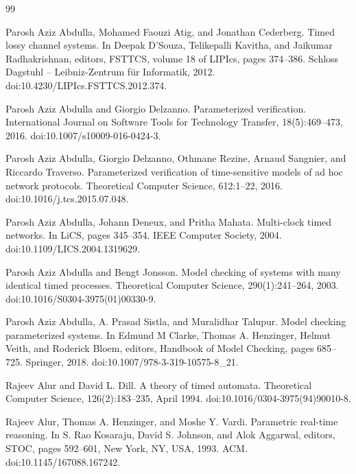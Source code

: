 \begin{thebibliography}{99}
\par\noindent    Parosh Aziz Abdulla, Mohamed Faouzi Atig, and Jonathan Cederberg.  Timed lossy channel systems.  In Deepak D’Souza, Telikepalli Kavitha, and Jaikumar Radhakrishnan, editors, FSTTCS, volume 18 of LIPIcs, pages 374--386. Schloss Dagstuhl -- Leibniz-Zentrum für Informatik, 2012.  doi:10.4230/LIPIcs.FSTTCS.2012.374.  

\par\noindent    Parosh Aziz Abdulla and Giorgio Delzanno.  Parameterized verification.  International Journal on Software Tools for Technology Transfer, 18(5):469--473, 2016.  doi:10.1007/s10009-016-0424-3.  

\par\noindent    Parosh Aziz Abdulla, Giorgio Delzanno, Othmane Rezine, Arnaud Sangnier, and Riccardo Traverso.  Parameterized verification of time-sensitive models of ad hoc network protocols.  Theoretical Computer Science, 612:1--22, 2016.  doi:10.1016/j.tcs.2015.07.048.  

\par\noindent    Parosh Aziz Abdulla, Johann Deneux, and Pritha Mahata.  Multi-clock timed networks.  In LiCS, pages 345--354. IEEE Computer Society, 2004.  doi:10.1109/LICS.2004.1319629.  

\par\noindent    Parosh Aziz Abdulla and Bengt Jonsson.  Model checking of systems with many identical timed processes.  Theoretical Computer Science, 290(1):241--264, 2003.  doi:10.1016/S0304-3975(01)00330-9.  

\par\noindent    Parosh Aziz Abdulla, A. Prasad Sistla, and Muralidhar Talupur.  Model checking parameterized systems.  In Edmund M Clarke, Thomas A. Henzinger, Helmut Veith, and Roderick Bloem, editors, Handbook of Model Checking, pages 685--725. Springer, 2018.  doi:10.1007/978-3-319-10575-8\_21.  

\par\noindent    Rajeev Alur and David L. Dill.  A theory of timed automata.  Theoretical Computer Science, 126(2):183--235, April 1994.  doi:10.1016/0304-3975(94)90010-8.  

\par\noindent    Rajeev Alur, Thomas A. Henzinger, and Moshe Y. Vardi.  Parametric real-time reasoning.  In S. Rao Kosaraju, David S. Johnson, and Alok Aggarwal, editors, STOC, pages 592--601, New York, NY, USA, 1993. ACM.  doi:10.1145/167088.167242.  


\end{thebibliography}
